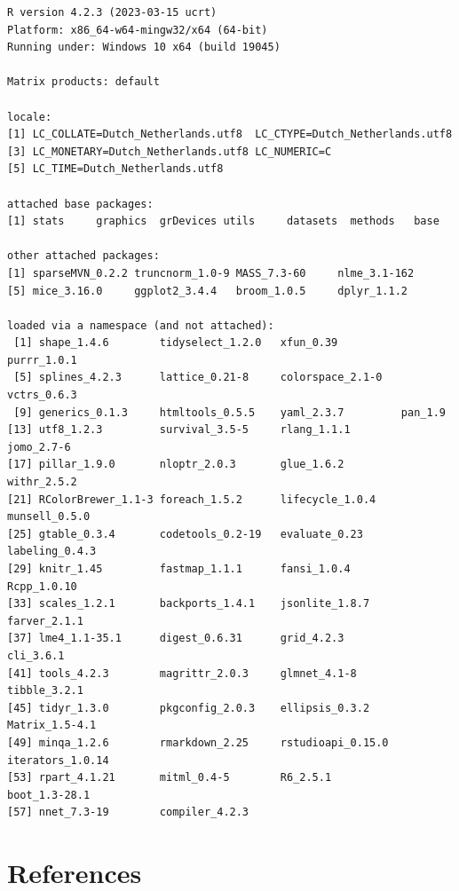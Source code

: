 \documentclass[
  letterpaper,
  DIV=11,
  numbers=noendperiod]{scrreprt}
\begin{document}
\begin{verbatim}
R version 4.2.3 (2023-03-15 ucrt)
Platform: x86_64-w64-mingw32/x64 (64-bit)
Running under: Windows 10 x64 (build 19045)

Matrix products: default

locale:
[1] LC_COLLATE=Dutch_Netherlands.utf8  LC_CTYPE=Dutch_Netherlands.utf8   
[3] LC_MONETARY=Dutch_Netherlands.utf8 LC_NUMERIC=C                      
[5] LC_TIME=Dutch_Netherlands.utf8    

attached base packages:
[1] stats     graphics  grDevices utils     datasets  methods   base     

other attached packages:
[1] sparseMVN_0.2.2 truncnorm_1.0-9 MASS_7.3-60     nlme_3.1-162   
[5] mice_3.16.0     ggplot2_3.4.4   broom_1.0.5     dplyr_1.1.2    

loaded via a namespace (and not attached):
 [1] shape_1.4.6        tidyselect_1.2.0   xfun_0.39          purrr_1.0.1       
 [5] splines_4.2.3      lattice_0.21-8     colorspace_2.1-0   vctrs_0.6.3       
 [9] generics_0.1.3     htmltools_0.5.5    yaml_2.3.7         pan_1.9           
[13] utf8_1.2.3         survival_3.5-5     rlang_1.1.1        jomo_2.7-6        
[17] pillar_1.9.0       nloptr_2.0.3       glue_1.6.2         withr_2.5.2       
[21] RColorBrewer_1.1-3 foreach_1.5.2      lifecycle_1.0.4    munsell_0.5.0     
[25] gtable_0.3.4       codetools_0.2-19   evaluate_0.23      labeling_0.4.3    
[29] knitr_1.45         fastmap_1.1.1      fansi_1.0.4        Rcpp_1.0.10       
[33] scales_1.2.1       backports_1.4.1    jsonlite_1.8.7     farver_2.1.1      
[37] lme4_1.1-35.1      digest_0.6.31      grid_4.2.3         cli_3.6.1         
[41] tools_4.2.3        magrittr_2.0.3     glmnet_4.1-8       tibble_3.2.1      
[45] tidyr_1.3.0        pkgconfig_2.0.3    ellipsis_0.3.2     Matrix_1.5-4.1    
[49] minqa_1.2.6        rmarkdown_2.25     rstudioapi_0.15.0  iterators_1.0.14  
[53] rpart_4.1.21       mitml_0.4-5        R6_2.5.1           boot_1.3-28.1     
[57] nnet_7.3-19        compiler_4.2.3    
\end{verbatim}

\hypertarget{references-4}{%
\section*{References}\label{references-4}}


\end{document}
